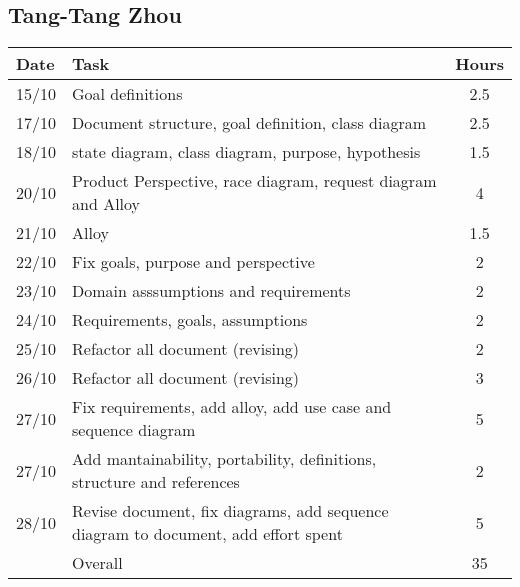 \subsection{Tang-Tang Zhou}

\begin{table}[H]
\begin{tabularx}{\textwidth}{|l|X|c|}
\hline
\rowcolor[HTML]{C0C0C0} 
Date & Task & Hours\\ \hline
15/10 & Goal definitions & 2.5\\ \hline
17/10 & Document structure, goal definition, class diagram & 2.5\\ \hline
18/10 & state diagram, class diagram, purpose, hypothesis & 1.5\\ \hline
20/10 & Product Perspective, race diagram, request diagram and Alloy & 4\\ \hline
21/10 & Alloy & 1.5 \\ \hline
22/10 & Fix goals, purpose and perspective & 2\\ \hline
23/10 & Domain asssumptions and requirements & 2\\ \hline
24/10 & Requirements, goals, assumptions & 2\\ \hline
25/10 & Refactor all document (revising) & 2\\ \hline
26/10 & Refactor all document (revising) & 3\\ \hline
27/10 & Fix requirements, add alloy, add use case and sequence diagram & 5\\ \hline
27/10 & Add mantainability, portability, definitions, structure and references & 2\\ \hline
28/10 & Revise document, fix diagrams, add sequence diagram to document, add effort spent & 5\\ \hline
\rowcolor[HTML]{C0C0C0} 
& Overall & 35\\ \hline
\end{tabularx}
\end{table}